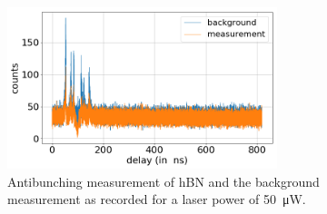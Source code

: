 \begin{figure}[H]
    \centering
    \includegraphics[width=0.7\textwidth]{img/output_t2/antibunch_example_50.0muW.png}
    \caption{Antibunching measurement of hBN and the background measurement as recorded for a laser power of \SI{50}{\micro W}.}
    \label{fig_antibunch_raw}
\end{figure}

